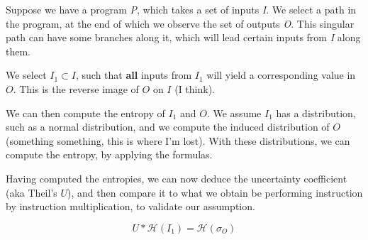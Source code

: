\documentclass[a4paper]{article}
\newcommand{\entropy}[1]{\mathcal{H}(#1)}
\begin{document}
Suppose we have a program \textit{P}, which takes a set of inputs \textit{I}.
We select a path in the program, at the end of which we observe the set of
outputs \textit{O}. This singular path can have some branches along it, which
will lead certain inputs from \textit{I} along them.

\begin{center}
\end{center}

We select \(I_1 \subset I\), such that \textbf{all} inputs from \(I_1\) will
yield a corresponding value in \(O\). This is the reverse image of \(O\) on
\(I\) (I think).

\begin{center}
\end{center}

We can then compute the entropy of \(I_1\) and \(O\). We assume \(I_1\) has a
distribution, such as a normal distribution, and we compute the induced
distribution of \(O\) (something something, this is where I'm lost). With
these distributions, we can compute the entropy, by applying the formulas.

\begin{center}
\end{center}

Having computed the entropies, we can now deduce the uncertainty coefficient
(aka Theil's \(U\)), and then compare it to what we obtain be performing
instruction by instruction multiplication, to validate our assumption.

\begin{center}
    \begin{equation*}
        U * \entropy{I_1} = \entropy{\sigma_O}
    \end{equation*}
\end{center}
\end{document}
